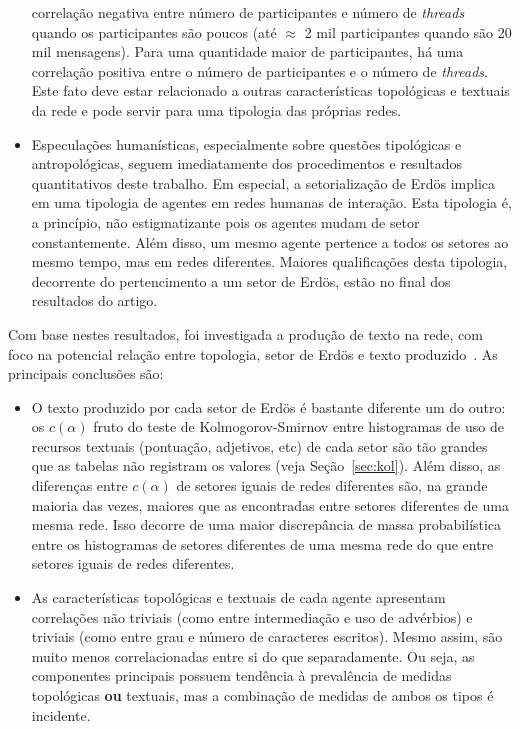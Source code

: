 \documentclass[a4paper,openright,12pt]{report} %
\begin{document}
\begin{itemize}
    correlação negativa entre número de participantes e número de \emph{threads} quando os participantes são poucos 
    (até $\approx$ 2 mil participantes quando são 20 mil mensagens).
    Para uma quantidade maior de participantes,
    há uma correlação positiva entre o número de participantes e o número de \emph{threads}.
    Este fato deve estar relacionado a outras características topológicas e textuais da rede e 
    pode servir para uma tipologia das próprias redes.
    \item Especulações humanísticas, especialmente sobre questões
        tipológicas e antropológicas, seguem imediatamente
        dos procedimentos e resultados quantitativos deste trabalho.
        Em especial, a setorialização de Erdös implica em uma
        tipologia de agentes em redes humanas de interação.
        Esta tipologia é, a princípio, não estigmatizante pois os agentes mudam de setor constantemente.
        Além disso, um mesmo agente pertence a todos os setores ao mesmo tempo, mas em redes diferentes.
        Maiores qualificações desta tipologia, decorrente do pertencimento
        a um setor de Erdös, estão no final dos resultados do artigo.
\end{itemize}

Com base nestes resultados, foi investigada a produção de texto na rede,
com foco na potencial relação entre topologia,
setor de Erdös e texto produzido~\cite{rcText}.
As principais conclusões são:
\begin{itemize}
    \item O texto produzido por cada setor de Erdös é bastante diferente um do outro:
        os $c(\alpha)$ fruto do teste de Kolmogorov-Smirnov
        entre histogramas
        de uso de recursos textuais (pontuação, adjetivos, etc) de cada setor
        são tão grandes que as tabelas não registram os valores (veja Seção~\ref{sec:kol}).
        Além disso, as diferenças entre $c(\alpha)$ de setores iguais de redes diferentes são,
        na grande maioria das vezes, maiores que as encontradas entre setores diferentes de uma mesma rede.
        Isso decorre de uma maior discrepância de massa probabilística entre os histogramas de setores diferentes de uma mesma rede do que entre setores iguais de redes diferentes. 

    \item As características topológicas e textuais de cada agente apresentam correlações não triviais (como entre intermediação e uso de advérbios) e triviais (como entre grau e número de caracteres escritos).
        Mesmo assim, são muito menos correlacionadas entre si do que separadamente. Ou seja, as componentes principais possuem tendência
        à prevalência de medidas topológicas {\bf ou} textuais,
        mas a combinação de medidas de ambos os tipos é incidente.
\end{itemize}
\end{document}
